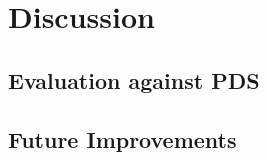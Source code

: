 \section{Discussion}
\label{sec:discussion}

\subsection{Evaluation against PDS}
\label{sub:evaluation_against_pds}


\subsection{Future Improvements}
\label{sub:future_improvements}

